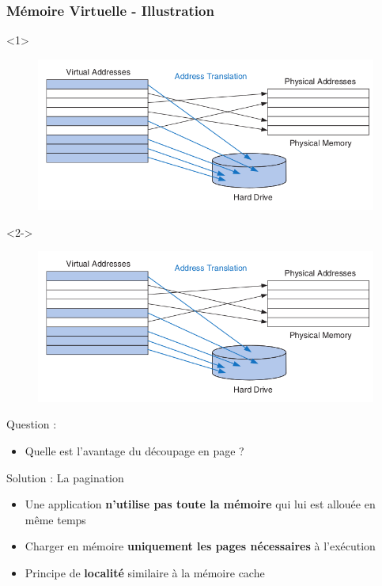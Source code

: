 \documentclass[8pt]{beamer}
\begin{document}
\begin{frame}[c]
    \frametitle{Mémoire Virtuelle - Illustration}
    \begin{onlyenv}<1>
        \vspace*{1.25cm}
        \begin{figure}
            \centering
            \includegraphics[width=.9\textwidth]{figures/vir.png}
        \end{figure}
    \end{onlyenv}
    \begin{onlyenv}<2->
        \begin{figure}
            \centering
            \includegraphics[width=.5\textwidth]{figures/vir.png}
        \end{figure}
    \end{onlyenv}
    \pause
    \begin{alertblock}{Question : }
        \begin{itemize}
            \item
                  Quelle est l'avantage du d\'ecoupage en page ?
        \end{itemize}
    \end{alertblock}
    \pause
    \begin{exampleblock}{Solution : La pagination}
        \begin{itemize}
            \item Une application \textbf{n'utilise pas toute la mémoire} qui
                  lui est
                  allouée en même
                  temps
            \item Charger en mémoire \textbf{uniquement les pages nécessaires}
                  à
                  l'exécution
            \item Principe de \textbf{localité} similaire \`a la m\'emoire
                  cache
        \end{itemize}
    \end{exampleblock}

\end{frame}
\end{document}
